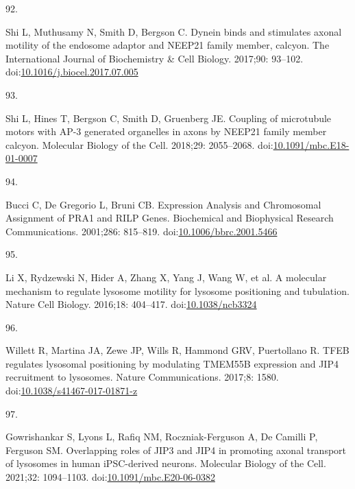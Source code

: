 \documentclass[
  12pt,
  a4paper,
]{book}
\newlength{\cslhangindent}
\newlength{\csllabelwidth}
\newlength{\cslentryspacingunit} %
\newenvironment{CSLReferences}[2] %
 {%
  \setlength{\parindent}{0pt}
  \ifodd #1
  \let\oldpar\par
  \def\par{\hangindent=\cslhangindent\oldpar}
  \fi
  \setlength{\parskip}{#2\cslentryspacingunit}
 }%
 {}
\newcommand{\CSLLeftMargin}[1]{\parbox[t]{\csllabelwidth}{#1}}
\newcommand{\CSLRightInline}[1]{\parbox[t]{\linewidth - \csllabelwidth}{#1}\break}
\begin{document}
\begin{CSLReferences}{0}{0}
\leavevmode{}%
\CSLLeftMargin{92. }%
\CSLRightInline{Shi L, Muthusamy N, Smith D, Bergson C. Dynein binds and stimulates axonal motility of the endosome adaptor and {NEEP21} family member, calcyon. The International Journal of Biochemistry \& Cell Biology. 2017;90: 93--102. doi:\href{https://doi.org/10.1016/j.biocel.2017.07.005}{10.1016/j.biocel.2017.07.005}}

\leavevmode{}%
\CSLLeftMargin{93. }%
\CSLRightInline{Shi L, Hines T, Bergson C, Smith D, Gruenberg JE. Coupling of microtubule motors with {AP-3} generated organelles in axons by {NEEP21} family member calcyon. Molecular Biology of the Cell. 2018;29: 2055--2068. doi:\href{https://doi.org/10.1091/mbc.E18-01-0007}{10.1091/mbc.E18-01-0007}}

\leavevmode{}%
\CSLLeftMargin{94. }%
\CSLRightInline{Bucci C, De Gregorio L, Bruni CB. Expression {Analysis} and {Chromosomal Assignment} of {PRA1} and {RILP Genes}. Biochemical and Biophysical Research Communications. 2001;286: 815--819. doi:\href{https://doi.org/10.1006/bbrc.2001.5466}{10.1006/bbrc.2001.5466}}

\leavevmode{}%
\CSLLeftMargin{95. }%
\CSLRightInline{Li X, Rydzewski N, Hider A, Zhang X, Yang J, Wang W, et al. A molecular mechanism to regulate lysosome motility for lysosome positioning and tubulation. Nature Cell Biology. 2016;18: 404--417. doi:\href{https://doi.org/10.1038/ncb3324}{10.1038/ncb3324}}

\leavevmode{}%
\CSLLeftMargin{96. }%
\CSLRightInline{Willett R, Martina JA, Zewe JP, Wills R, Hammond GRV, Puertollano R. {TFEB} regulates lysosomal positioning by modulating {TMEM55B} expression and {JIP4} recruitment to lysosomes. Nature Communications. 2017;8: 1580. doi:\href{https://doi.org/10.1038/s41467-017-01871-z}{10.1038/s41467-017-01871-z}}

\leavevmode{}%
\CSLLeftMargin{97. }%
\CSLRightInline{Gowrishankar S, Lyons L, Rafiq NM, Roczniak-Ferguson A, De Camilli P, Ferguson SM. Overlapping roles of {JIP3} and {JIP4} in promoting axonal transport of lysosomes in human {iPSC-derived} neurons. Molecular Biology of the Cell. 2021;32: 1094--1103. doi:\href{https://doi.org/10.1091/mbc.E20-06-0382}{10.1091/mbc.E20-06-0382}}


\end{CSLReferences}
\end{document}
